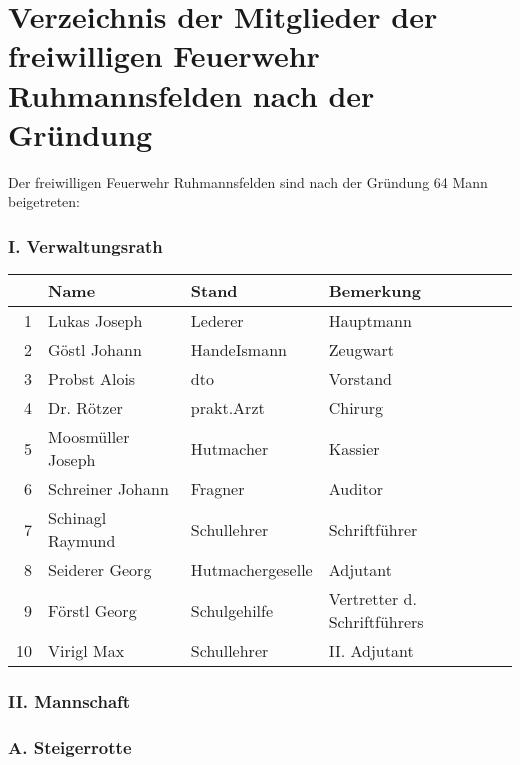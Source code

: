 \documentclass[12pt,a4paper]{book}
\begin{document}
\chapter[Verzeichnis der Mitglieder]{Verzeichnis der Mitglieder der freiwilligen
Feuerwehr Ruhmannsfelden nach der Gründung}

Der freiwilligen Feuerwehr Ruhmannsfelden sind nach der Gründung 64 Mann
beigetreten:

\subsection*{I. Verwaltungsrath}

\begin{tabular}{rlll}
& Name & Stand & Bemerkung\\
\hline
1 & Lukas Joseph & Lederer & Hauptmann\\
2 & Göstl Johann & HandeIsmann & Zeugwart\\
3 & Probst Alois & dto & Vorstand\\
4 & Dr. Rötzer & prakt.Arzt & Chirurg\\
5 & Moosmüller Joseph & Hutmacher & Kassier\\
6 & Schreiner Johann & Fragner & Auditor\\
7 & Schinagl Raymund & Schullehrer & Schriftführer\\
8 & Seiderer Georg & Hutmachergeselle & Adjutant\\
9 & Förstl Georg & Schulgehilfe & Vertretter d. Schriftführers\\
10 & Virigl Max & Schullehrer & II. Adjutant\\
\end{tabular}

\subsection*{II. Mannschaft}

\subsection*{A. Steigerrotte}
\end{document}
